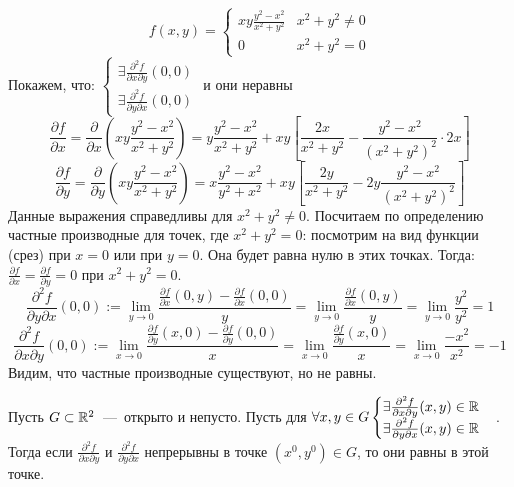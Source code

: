 \begin{example}
    \begin{equation*}
        f(x, y) = 
        \begin{cases}
            xy\frac{y^2 - x^2}{x^2 + y^2} & x^2+y^2 \neq 0 \\
            0 & x^2 + y^2 = 0
        \end{cases}
    \end{equation*}
    Покажем, что: 
    $
        \begin{cases}
             \exists \frac{\partial^2f}{\partial x \partial y}(0, 0) \\ 
             \exists \frac{\partial^2f}{\partial y \partial x}(0, 0)
        \end{cases}
    $ и они неравны
    $$\frac{\partial f}{\partial x} =\frac{\partial}{\partial x}\left(xy \frac{y^2 - x^2}{x^2 + y^2}\right) = y \frac{y^2 - x^2}{x^2 + y^2} + xy
    \left[\frac{2x}{x^2 + y^2} - \frac{y^2 - x^2}{(x^2 + y^2)^2}\cdot 2x\right]$$
    $$\dfrac{\partial f}{\partial y} = \frac{\partial}{\partial y}\left(xy \frac{y^2 - x^2}{x^2 + y^2}\right) = x \frac{y^2 - x^2}{y^2 + x^2} + xy\left[ \frac{2y}{x^2 + y^2} - 2y \frac{y^2 - x^2}{(x^2 + y^2)^2}\right]$$
    Данные выражения справедливы для $x^2 + y^2 \neq 0$. Посчитаем по определению частные производные для точек, где $x^2 + y^2 = 0$: посмотрим на вид функции (срез) при $x = 0$ или при $y = 0$. Она будет равна нулю в этих точках. Тогда: $\frac{\partial f}{\partial x} = \frac{\partial f}{\partial y} = 0$ при $x^2 + y^2 = 0$.
    $$\frac{\partial^2 f}{\partial y \partial x}(0, 0):= \lim \limits_{y \rightarrow 0} \dfrac{\frac{\partial f}{\partial x} (0, y)- \frac{\partial f}{\partial x}(0, 0)}{y} = \lim \limits_{y \rightarrow 0} \dfrac{\frac{\partial f}{\partial x}(0, y)}{y} = \lim \limits_{y \rightarrow 0} \dfrac{y^2}{y^2} = 1$$
    $$\frac{\partial^2 f}{\partial x \partial y}(0, 0) := \lim \limits_{x \rightarrow 0}\dfrac{\frac{\partial f}{\partial y}(x, 0) - \frac{\partial f}{\partial y}(0, 0)}{x} = \lim \limits_{x \rightarrow 0}\dfrac{\frac{\partial f}{\partial y}(x, 0)}{x} = \lim \limits_{x \rightarrow 0}\dfrac{-x^2}{x^2} = -1$$
    Видим, что частные производные существуют, но не равны.
\end{example}
\begin{theorem} \hypertarget{thrm2.2}{}
    Пусть $G \subset \mathbb{R}^2$~---~открыто и непусто. Пусть для $\forall x, y \in G \begin{cases}
        \exists \frac{\partial^2 f}{\partial x \partial y}(x, y) \in \mathbb{R} \\ 
        \exists \frac{\partial^2 f}{\partial y \partial x}(x, y) \in \mathbb{R}
    \end{cases}$. Тогда если $\frac{\partial^2 f}{\partial x \partial y}$ и $\frac{\partial^2 f}{\partial y \partial x}$ непрерывны в точке $(x^0, y^0) \in G$, то они равны в этой точке. 
\end{theorem}
